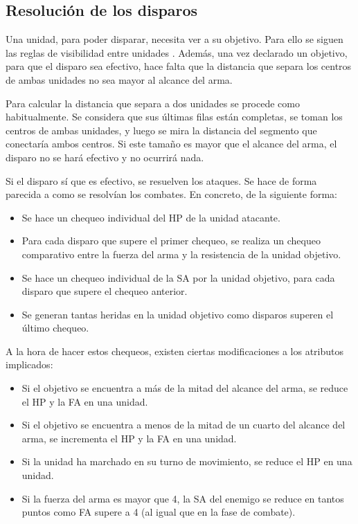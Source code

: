 \subsection*{Resolución de los disparos}
\label{resoluciondisparos}
Una unidad, para poder disparar, necesita ver a su objetivo. Para ello
se siguen las reglas de visibilidad entre unidades . Además, una vez
declarado un objetivo, para que el disparo sea efectivo, hace falta
que la distancia que separa los centros de ambas unidades no sea mayor
al alcance del arma.

Para calcular la distancia que separa a dos unidades se procede como
habitualmente. Se considera que sus últimas filas están completas, se
toman los centros de ambas unidades, y luego se mira la distancia
del segmento que conectaría ambos centros. Si este tamaño es mayor que
el alcance del arma, el disparo no se hará efectivo y no ocurrirá
nada.

Si el disparo sí que es efectivo, se resuelven los ataques. Se hace de
forma parecida a como se resolvían los combates. En concreto, de la
siguiente forma:

\begin{itemize}
\item Se hace un chequeo individual del HP de la unidad atacante.
\item Para cada disparo que supere el primer chequeo, se realiza un
  chequeo comparativo entre la fuerza del arma y la
  resistencia de la unidad objetivo.
\item Se hace un chequeo individual de la SA por la unidad objetivo,
  para cada disparo que supere el chequeo anterior.
\item Se generan tantas heridas en la unidad objetivo como disparos
  superen el último chequeo.
\end{itemize}

A la hora de hacer estos chequeos, existen ciertas
modificaciones a los atributos implicados:
\begin{itemize}
\item Si el objetivo se encuentra a más de la mitad del alcance del
  arma, se reduce el HP y la FA en una unidad.
\item Si el objetivo se encuentra a menos de la mitad de un cuarto del
  alcance del arma, se incrementa el HP y la FA en una unidad.
\item Si la unidad ha marchado en su turno de movimiento, se reduce el
  HP en una unidad.
\item Si la fuerza del arma es mayor que 4, la SA del enemigo se
  reduce en tantos puntos como FA supere a 4 (al igual que en la fase
  de combate).
\end{itemize}

